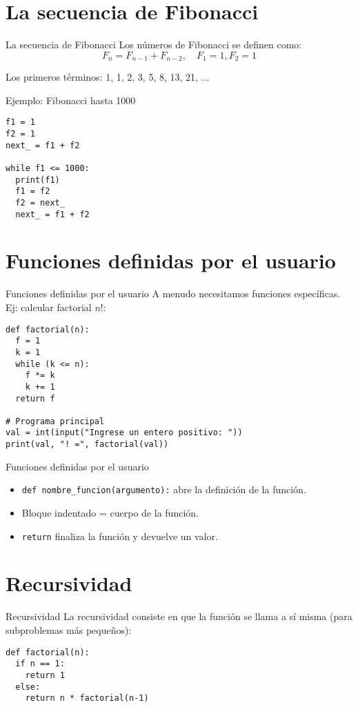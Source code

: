 \documentclass[10pt]{beamer}
\begin{document}
\section{La secuencia de Fibonacci}
\begin{frame}{La secuencia de Fibonacci}
Los números de Fibonacci se definen como:
\[
F_n = F_{n-1} + F_{n-2}, \quad F_1 = 1, F_2 = 1
\]

Los primeros términos: 1, 1, 2, 3, 5, 8, 13, 21, ...

\end{frame}

\begin{frame}[fragile]{Ejemplo: Fibonacci hasta 1000}
\begin{verbatim}
f1 = 1
f2 = 1
next_ = f1 + f2

while f1 <= 1000:
  print(f1)
  f1 = f2
  f2 = next_
  next_ = f1 + f2
\end{verbatim}
\end{frame}

\section{Funciones definidas por el usuario}
\begin{frame}[fragile]{Funciones definidas por el usuario}
A menudo necesitamos funciones específicas. Ej: calcular factorial \(n!\):
\begin{verbatim}
def factorial(n):
  f = 1
  k = 1
  while (k <= n):
    f *= k
    k += 1
  return f

# Programa principal
val = int(input("Ingrese un entero positivo: "))
print(val, "! =", factorial(val))
\end{verbatim}
\end{frame}

\begin{frame}{Funciones definidas por el usuario}
\begin{itemize}
    \item \texttt{def nombre\_funcion(argumento):}  
      abre la definición de la función.  
    \item Bloque indentado = cuerpo de la función.
    \item \texttt{return} finaliza la función y devuelve un valor.
\end{itemize}
\end{frame}

\section{Recursividad}
\begin{frame}[fragile]{Recursividad}
La recursividad consiste en que la función se llama a sí misma (para subproblemas más pequeños):
\begin{verbatim}
def factorial(n):
  if n == 1:
    return 1
  else:
    return n * factorial(n-1)
\end{verbatim}
\end{frame}
\end{document}
